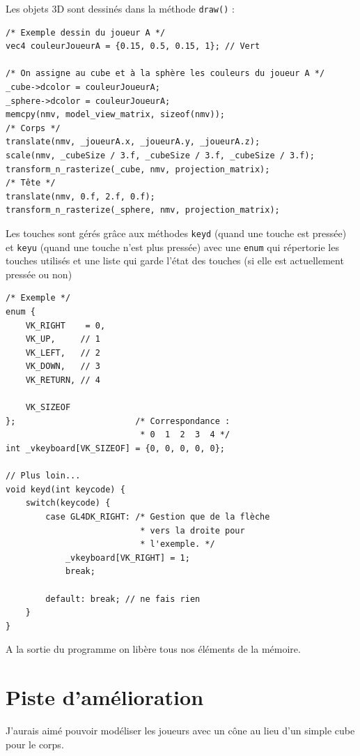 \documentclass{article}
\begin{document}
    Les objets 3D sont dessinés dans la méthode \texttt{draw()} :
    \begin{center}\begin{minipage}{0.9\textwidth}
        \begin{verbatim}
/* Exemple dessin du joueur A */
vec4 couleurJoueurA = {0.15, 0.5, 0.15, 1}; // Vert

/* On assigne au cube et à la sphère les couleurs du joueur A */
_cube->dcolor = couleurJoueurA;
_sphere->dcolor = couleurJoueurA;
memcpy(nmv, model_view_matrix, sizeof(nmv));
/* Corps */
translate(nmv, _joueurA.x, _joueurA.y, _joueurA.z);
scale(nmv, _cubeSize / 3.f, _cubeSize / 3.f, _cubeSize / 3.f);
transform_n_rasterize(_cube, nmv, projection_matrix);
/* Tête */
translate(nmv, 0.f, 2.f, 0.f);
transform_n_rasterize(_sphere, nmv, projection_matrix);
        \end{verbatim}
    \end{minipage}\end{center}
    \vspace{10pt}

    Les touches sont gérés grâce aux méthodes \texttt{keyd} (quand une touche est pressée) et \texttt{keyu} (quand une touche n'est plus pressée) avec une \texttt{enum} qui répertorie les touches utilisés et une liste qui garde l'état des touches (si elle est actuellement pressée ou non)
    \begin{center}\begin{minipage}{0.9\textwidth}
        \begin{verbatim}
/* Exemple */
enum {
    VK_RIGHT    = 0,
    VK_UP,     // 1
    VK_LEFT,   // 2
    VK_DOWN,   // 3
    VK_RETURN, // 4

    VK_SIZEOF
};                        /* Correspondance :
                           * 0  1  2  3  4 */
int _vkeyboard[VK_SIZEOF] = {0, 0, 0, 0, 0};

// Plus loin...
void keyd(int keycode) {
    switch(keycode) {
        case GL4DK_RIGHT: /* Gestion que de la flèche
                           * vers la droite pour
                           * l'exemple. */
            _vkeyboard[VK_RIGHT] = 1;
            break;

        default: break; // ne fais rien
    }
}
        \end{verbatim}
    \end{minipage}\end{center}
    \vspace{10pt}

    A la sortie du programme on libère tous nos éléments de la mémoire.

    \section{Piste d'amélioration}
    J'aurais aimé pouvoir modéliser les joueurs avec un cône au lieu d'un simple cube pour le corps.
\end{document}

